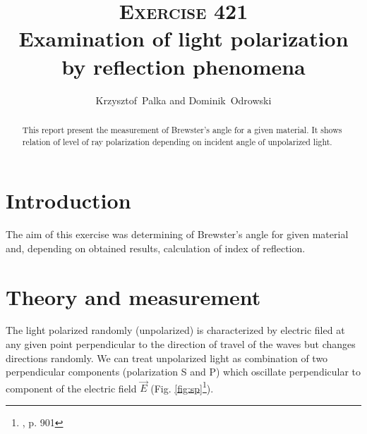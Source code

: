 \documentclass[a4paper,12pt]{article}
\author{Krzysztof~Palka and Dominik~Odrowski}
\title{\textsc{Exercise} 421 \\ Examination of light polarization by reflection phenomena}
\begin{document}
\maketitle

\begin{abstract}
    This report present the measurement of Brewster's angle for a given material. It shows relation of level of ray polarization depending on incident angle of unpolarized light.    
\end{abstract}
\section{Introduction}
    The aim of this exercise was determining of Brewster's angle for given material and, depending on obtained results, calculation of index of reflection. 


\section{Theory and measurement}
    The light polarized randomly (unpolarized) is characterized by electric filed at any given point perpendicular to the direction of travel of the waves but changes directions randomly. We can treat unpolarized light as combination of two perpendicular components (polarization S and P) which oscillate perpendicular to component of the electric field $\vec E$ (Fig. \ref{fig:sp}\footnote{\cite{HRW}, p. 901}).
\end{document}
